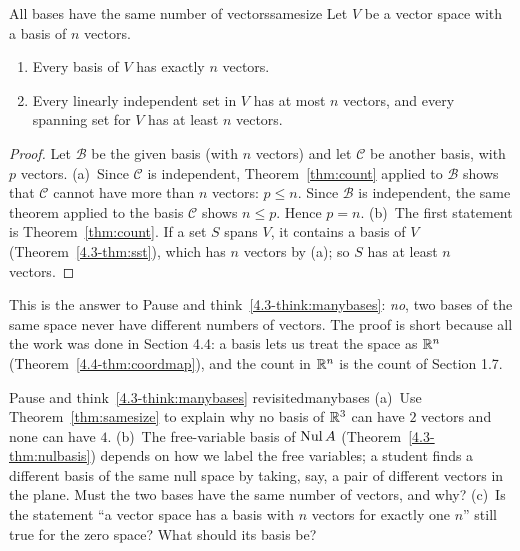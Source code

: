 \documentclass[11pt]{article}
\begin{document}

\begin{thm}{All bases have the same number of vectors}{samesize}
Let $V$ be a vector space with a basis of $n$ vectors.
\begin{enumerate}[label=(\alph*),itemsep=1pt]
  \item Every basis of $V$ has exactly $n$ vectors.
  \item Every linearly independent set in $V$ has at most $n$ vectors, and every spanning set for $V$ has at least $n$ vectors.
\end{enumerate}
\end{thm}

\begin{proof}
Let $\mathcal{B}$ be the given basis (with $n$ vectors) and let $\mathcal{C}$ be another basis, with $p$ vectors. (a)~Since $\mathcal{C}$ is independent, Theorem~\ref{thm:count} applied to $\mathcal{B}$ shows that $\mathcal{C}$ cannot have more than $n$ vectors: $p\le n$. Since $\mathcal{B}$ is independent, the same theorem applied to the basis $\mathcal{C}$ shows $n\le p$. Hence $p=n$. (b)~The first statement is Theorem~\ref{thm:count}. If a set $S$ spans $V$, it contains a basis of $V$ (Theorem~\ref{4.3-thm:sst}), which has $n$ vectors by (a); so $S$ has at least $n$ vectors.
\end{proof}

This is the answer to Pause and think~\ref{4.3-think:manybases}: \emph{no}, two bases of the same space never have different numbers of vectors. The proof is short because all the work was done in Section 4.4: a basis lets us treat the space as $\mathbb{R}^n$ (Theorem~\ref{4.4-thm:coordmap}), and the count in $\mathbb{R}^n$ is the count of Section 1.7.

\begin{think}{Pause and think~\ref{4.3-think:manybases} revisited}{manybases}
(a)~Use Theorem~\ref{thm:samesize} to explain why no basis of $\mathbb{R}^3$ can have $2$ vectors and none can have $4$. (b)~The free-variable basis of $\operatorname{Nul} A$ (Theorem~\ref{4.3-thm:nulbasis}) depends on how we label the free variables; a student finds a different basis of the same null space by taking, say, a pair of different vectors in the plane. Must the two bases have the same number of vectors, and why? (c)~Is the statement ``a vector space has a basis with $n$ vectors for exactly one $n$'' still true for the zero space? What should its basis be?
\end{think}
\end{document}
